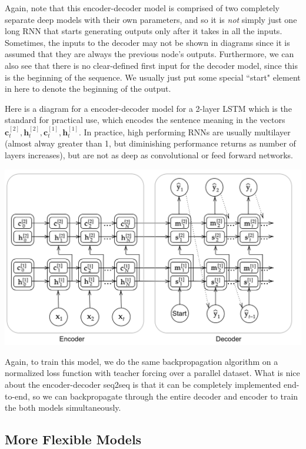     Again, note that this encoder-decoder model is comprised of two completely separate deep models with their own parameters, and so it is \textit{not} simply just one long RNN that starts generating outputs only after it takes in all the inputs. Sometimes, the inputs to the decoder may not be shown in diagrams since it is assumed that they are always the previous node's outputs. Furthermore, we can also see that there is no clear-defined first input for the decoder model, since this is the beginning of the sequence. We usually just put some special ``start" element in here to denote the beginning of the output. 

    Here is a diagram for a encoder-decoder model for a 2-layer LSTM which is the standard for practical use, which encodes the sentence meaning in the vectors $\mathbf{c}_t^{[2]}, \mathbf{h}_t ^{[2]}, \mathbf{c}_t^{[1]}, \mathbf{h}_t^{[1]}$. In practice, high performing RNNs are usually multilayer (almost alway greater than 1, but diminishing performance returns as number of layers increases), but are not as deep as convolutional or feed forward networks. 
    \begin{center}
        \includegraphics[scale=0.3]{img/05_Encoder_Decoder/encoder_decoder_LSTM.png}
    \end{center}
    Again, to train this model, we do the same backpropagation algorithm on a normalized loss function with teacher forcing over a parallel dataset. What is nice about the encoder-decoder seq2seq is that it can be completely implemented end-to-end, so we can backpropagate through the entire decoder and encoder to train the both models simultaneously. 

  \subsection{More Flexible Models} 

